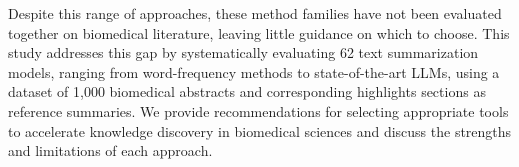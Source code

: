 Despite this range of approaches, these method families have not been evaluated together on biomedical literature, leaving little guidance on which to choose. This study addresses this gap by systematically evaluating 62 text summarization models, ranging from word-frequency methods to state-of-the-art \acp{LLM}, using a dataset of 1,000 biomedical abstracts and corresponding highlights sections as reference summaries. We provide recommendations for selecting appropriate tools to accelerate knowledge discovery in biomedical sciences and discuss the strengths and limitations of each approach.  